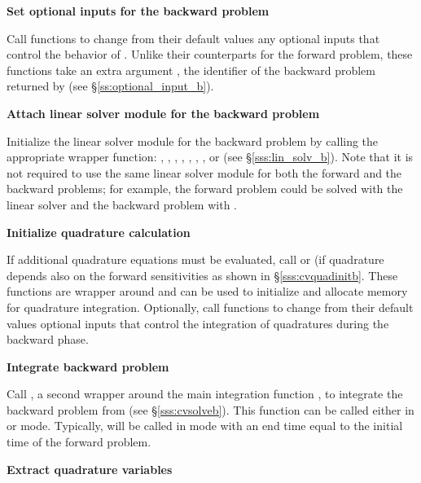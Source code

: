\begin{Steps}
\item
  {\bf Set optional inputs for the backward problem}

  Call  functions to change from their default values
  any optional inputs that control the behavior of {\cvodes}. Unlike
  their counterparts for the forward problem, these functions take an
  extra argument , the identifier of the backward problem returned 
  by  (see \S\ref{ss:optional_input_b}).


\item \label{i:lin_solverB}
  {\bf Attach linear solver module for the backward problem}

  Initialize the linear solver module 
  for the backward problem by calling the appropriate wrapper
  function: , , , ,
  , , , or  (see \S\ref{sss:lin_solv_b}). 
  Note that it is not required to use the same linear solver module for both the forward 
  and the backward problems; for example, the forward problem could be solved
  with the {\cvdense} linear solver and the backward problem with {\cvspgmr}.

\item \label{i:quadB}
  {\bf Initialize quadrature calculation}

  If additional quadrature equations must be evaluated, 
  call  or  (if quadrature depends also on the
  forward sensitivities as shown in \S\ref{sss:cvquadinitb}. These functions are
  wrapper around  and can be used to initialize and allocate 
  memory for quadrature integration. Optionally, call  functions 
  to change from their default values optional inputs that control the integration 
  of quadratures during the backward phase.

\item
  {\bf Integrate backward problem}

  Call , a second wrapper around the {\cvodes} main integration
  function , to integrate the backward problem from 
  (see \S\ref{sss:cvsolveb}). This function can be called either in 
  or  mode. Typically,  will be called in 
  mode with an end time equal to the initial time of the forward problem.

\item \label{i:back_end}
  {\bf Extract quadrature variables}


\end{Steps}
